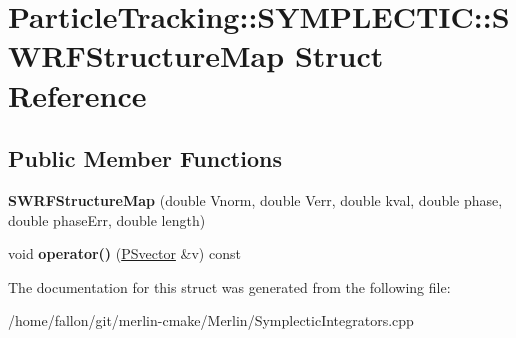 \hypertarget{structParticleTracking_1_1SYMPLECTIC_1_1SWRFStructureMap}{}\section{Particle\+Tracking\+:\+:S\+Y\+M\+P\+L\+E\+C\+T\+IC\+:\+:S\+W\+R\+F\+Structure\+Map Struct Reference}
\label{structParticleTracking_1_1SYMPLECTIC_1_1SWRFStructureMap}
\subsection*{Public Member Functions}
\begin{DoxyCompactItemize}
\item 
\mbox{\label{structParticleTracking_1_1SYMPLECTIC_1_1SWRFStructureMap_ad5300d01361322ab293ebd32c9567a60}} 
{\bfseries S\+W\+R\+F\+Structure\+Map} (double Vnorm, double Verr, double kval, double phase, double phase\+Err, double length)
\item 
\mbox{\label{structParticleTracking_1_1SYMPLECTIC_1_1SWRFStructureMap_a9d98458563306f97932054d56998d1b3}} 
void {\bfseries operator()} (\hyperlink{classPSvector}{P\+Svector} \&v) const
\end{DoxyCompactItemize}


The documentation for this struct was generated from the following file\+:\begin{DoxyCompactItemize}
\item 
/home/fallon/git/merlin-\/cmake/\+Merlin/Symplectic\+Integrators.\+cpp\end{DoxyCompactItemize}
